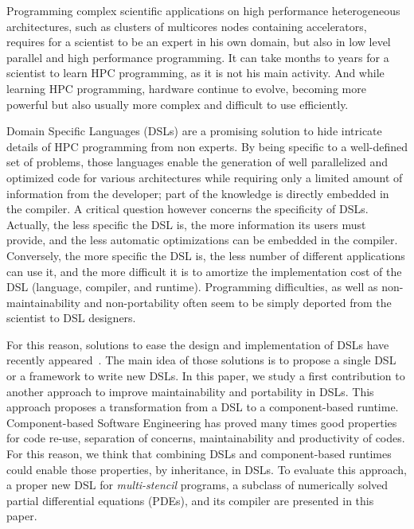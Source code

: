 Programming complex scientific applications on high performance heterogeneous architectures, such as clusters of multicores nodes containing accelerators, requires for a scientist to be an expert in his own domain, but also in low level parallel and high performance programming. It can take months to years for a scientist to learn HPC programming, as it is not his main activity. And while learning HPC programming, hardware continue to evolve, becoming more powerful but also usually more complex and difficult to use efficiently.

Domain Specific Languages (DSLs) are a promising solution to hide intricate details of HPC programming from non experts.
By being specific to a well-defined set of problems, those languages enable the generation of well parallelized and optimized code for various architectures while requiring only a limited amount of information from the developer; part of the knowledge is directly embedded in the compiler.
A critical question however concerns the specificity of DSLs.
Actually, the less specific the DSL is, the more information its users must provide, and the less automatic optimizations can be embedded in the compiler.
Conversely, the more specific the DSL is, the less number of different applications can use it, and the more difficult it is to amortize the implementation cost of the DSL (language, compiler, and runtime).
Programming difficulties, as well as non-maintainability and non-portability often seem to be simply deported from the scientist to DSL designers.

For this reason, solutions to ease the design and implementation of DSLs have recently appeared~\cite{Fernandez:2014:DFL:2691166.2691168}. The main idea of those solutions is to propose a single DSL or a framework to write new DSLs. In this paper, we study a first contribution to another approach to improve maintainability and portability in DSLs. This approach proposes a transformation from a DSL to a component-based runtime. Component-based Software Engineering has proved many times good properties for code re-use, separation of concerns, maintainability and productivity of codes. For this reason, we think that combining DSLs and component-based runtimes could enable those properties, by inheritance, in DSLs.
To evaluate this approach, a proper new DSL for \emph{multi-stencil} programs, \ie a subclass of numerically solved partial differential equations (PDEs), and its compiler are presented in this paper.

